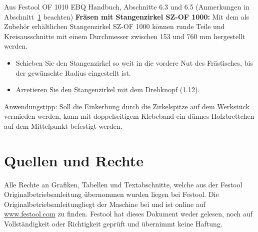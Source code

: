 \documentclass{\basedir/fablab-document}
\begin{document}
\begin{leftbar}{Aus Festool OF 1010 EBQ Handbuch, Abschnitte 6.3 und 6.5 (Anmerkungen in Abschnitt~\ref{quellen} beachten)}
\textbf{Fräsen mit Stangenzirkel SZ-OF 1000:}
Mit dem als Zubehör erhältlichen Stangenzirkel
SZ-OF 1000 können runde Teile und Kreisausschnitte
mit einem Durchmesser zwischen 153
und 760 mm hergestellt werden.
\begin{itemize}
    \item Schieben Sie den Stangenzirkel so weit in die
vordere Nut des Frästisches, bis der gewünschte
Radius eingestellt ist.
    \item Arretieren Sie den Stangenzirkel mit dem Drehknopf
(1.12).
\end{itemize}
Anwendungstipp:
Soll die Einkerbung durch die Zirkelspitze auf dem
Werkstück vermieden werden, kann mit doppelseitigem
Klebeband ein dünnes Holzbrettchen auf
dem Mittelpunkt befestigt werden.
\end{leftbar}

\section{Quellen und Rechte}
\label{quellen}
Alle Rechte an Grafiken, Tabellen und Textabschnitte, welche aus der Festool Originalbetriebsanleitung übernommen wurden liegen bei Festool. Die \glqq Originalbetriebsanleitung\grqq liegt der Maschine bei und ist online auf \url{www.festool.com} zu finden. Festool hat dieses Dokument weder gelesen, noch auf Vollständigkeit oder Richtigkeit geprüft und übernimmt keine Haftung.
\end{document}
